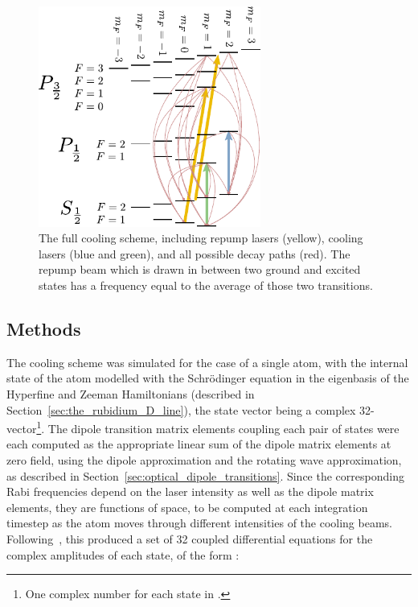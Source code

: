 \begin{figure}
\begin{center}
\includegraphics[width=0.65\textwidth]{figures/unsorted/cooling_full.pdf}
\caption{The full cooling scheme, including repump lasers (yellow), cooling lasers (blue and green), and all possible decay paths (red). The repump beam which is drawn in between two ground and excited states has a frequency equal to the average of those two transitions.}\label{fig:cooling_full}
\end{center}
\end{figure}

\subsection{Methods}

The cooling scheme was simulated for the case of a single atom, with the internal state of the atom modelled with the Schr\"odinger equation in the eigenbasis of the Hyperfine and Zeeman Hamiltonians (described in Section~\ref{sec:the_rubidium_D_line}), the state vector being a complex 32-vector\footnote{One complex number for each state in .}. The dipole transition matrix elements coupling each pair of states were each computed as the appropriate linear sum of the dipole matrix elements at zero field, using the dipole approximation and the rotating wave approximation, as described in Section~\ref{sec:optical_dipole_transitions}. Since the corresponding Rabi frequencies depend on the laser intensity as well as the dipole matrix elements, they are functions of space, to be computed at each integration timestep as the atom moves through different intensities of the cooling beams. Following~\cite[p 4]{metcalf_laser_1999}, this produced a set of 32 coupled differential equations for the complex amplitudes of each state, of the form :


